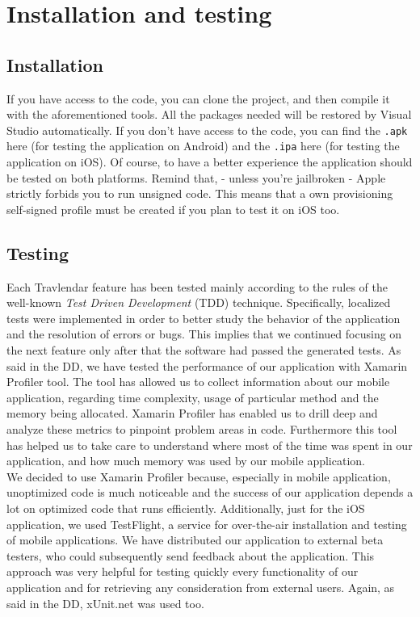 \chapter{Installation and testing}
\label{cha:testing}

\section{Installation}
If you have access to the code, you can clone the project, and then compile it with the aforementioned tools. All the packages needed will be restored by Visual Studio automatically. If you don't have access to the code, you can find the \verb|.apk| here (for testing the application on Android) and the \verb|.ipa| here (for testing the application on iOS). Of course, to have a better experience the application should be tested on both platforms. Remind that, - unless you're jailbroken - Apple strictly forbids you to run unsigned code. This means that a own provisioning self-signed profile must be created if you plan to test it on iOS too.

\section{Testing}
Each Travlendar feature has been tested mainly according to the rules of the well-known \textit{Test Driven Development} (TDD) technique. Specifically, localized tests were implemented in order to better study the behavior of the application and the resolution of errors or bugs. This implies that we continued focusing on the next feature only after that the software had passed the generated tests. As said in the DD, we have tested the performance of our application with Xamarin Profiler tool. The tool has allowed us to collect information about our mobile application, regarding time complexity, usage of particular method and the memory being allocated. Xamarin Profiler has enabled us to drill deep and analyze these metrics to pinpoint problem areas in code. Furthermore this tool has helped us to take care to understand where most of the time was spent in our application, and how much memory was used by our mobile application.\\

We decided to use Xamarin Profiler because, especially in mobile application, unoptimized code is much noticeable and the success of our application depends a lot on optimized code that runs efficiently. Additionally, just for the iOS application, we used TestFlight, a service for over-the-air installation and testing of mobile applications. We have distributed our application to external beta testers, who could subsequently send feedback about the application. This approach was very helpful for testing quickly every functionality of our application and for retrieving any consideration from external users. Again, as said in the DD, xUnit.net was used too.

